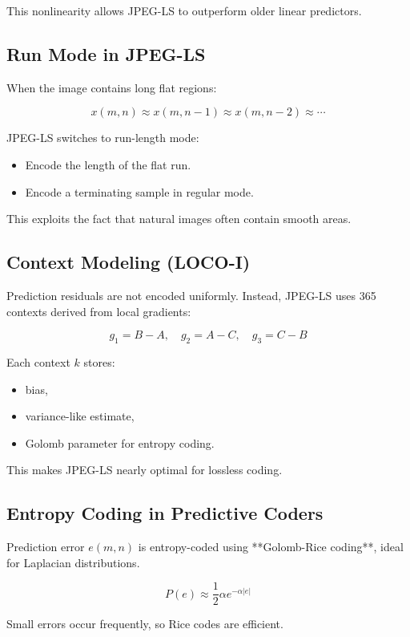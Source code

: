 \documentclass{AnantDocumentation}
\begin{document}
This nonlinearity allows JPEG-LS to outperform older linear predictors.

\subsection{Run Mode in JPEG-LS}

When the image contains long flat regions:

\[
x(m,n) \approx x(m,n-1) \approx x(m,n-2) \approx \cdots
\]

JPEG-LS switches to run-length mode:

\begin{itemize}
\item Encode the length of the flat run.
\item Encode a terminating sample in regular mode.
\end{itemize}

This exploits the fact that natural images often contain smooth areas.

\subsection{Context Modeling (LOCO-I)}

Prediction residuals are not encoded uniformly.  
Instead, JPEG-LS uses 365 contexts derived from local gradients:

\[
g_1 = B - A,\quad g_2 = A - C,\quad g_3 = C - B
\]

Each context $k$ stores:

\begin{itemize}
\item bias,
\item variance-like estimate,
\item Golomb parameter for entropy coding.
\end{itemize}

This makes JPEG-LS nearly optimal for lossless coding.

\subsection{Entropy Coding in Predictive Coders}

Prediction error $e(m,n)$ is entropy-coded using **Golomb-Rice coding**, ideal for Laplacian distributions.

\[
P(e) \approx \frac{1}{2} \alpha e^{-\alpha|e|}
\]

Small errors occur frequently, so Rice codes are efficient.
\end{document}
